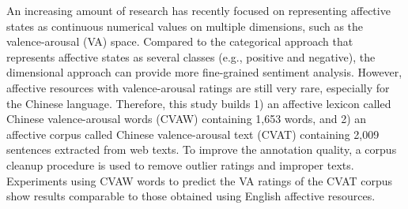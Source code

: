 An increasing amount of research has recently focused on representing affective states as continuous numerical values on multiple dimensions, such as the valence-arousal (VA) space. Compared to the categorical approach that represents affective states as several classes (e.g., positive and negative), the dimensional approach can provide more fine-grained sentiment analysis. However, affective resources with valence-arousal ratings are still very rare, especially for the Chinese language. Therefore, this study builds 1) an affective lexicon called Chinese valence-arousal words (CVAW) containing 1,653 words, and 2) an affective corpus called Chinese valence-arousal text (CVAT) containing 2,009 sentences extracted from web texts. To improve the annotation quality, a corpus cleanup procedure is used to remove outlier ratings and improper texts. Experiments using CVAW words to predict the VA ratings of the CVAT corpus show results comparable to those obtained using English affective resources.
